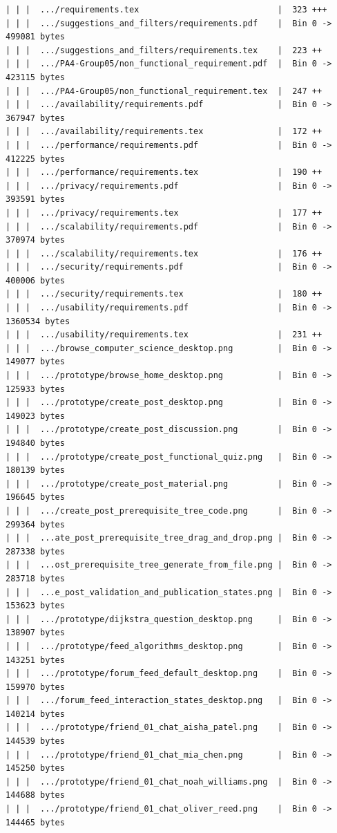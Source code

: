 \documentclass[12pt]{article}
\begin{document}
\begin{lstlisting}[numbers=none,breaklines=true]
| | |  .../requirements.tex                            |  323 +++
| | |  .../suggestions_and_filters/requirements.pdf    |  Bin 0 -> 499081 bytes
| | |  .../suggestions_and_filters/requirements.tex    |  223 ++
| | |  .../PA4-Group05/non_functional_requirement.pdf  |  Bin 0 -> 423115 bytes
| | |  .../PA4-Group05/non_functional_requirement.tex  |  247 ++
| | |  .../availability/requirements.pdf               |  Bin 0 -> 367947 bytes
| | |  .../availability/requirements.tex               |  172 ++
| | |  .../performance/requirements.pdf                |  Bin 0 -> 412225 bytes
| | |  .../performance/requirements.tex                |  190 ++
| | |  .../privacy/requirements.pdf                    |  Bin 0 -> 393591 bytes
| | |  .../privacy/requirements.tex                    |  177 ++
| | |  .../scalability/requirements.pdf                |  Bin 0 -> 370974 bytes
| | |  .../scalability/requirements.tex                |  176 ++
| | |  .../security/requirements.pdf                   |  Bin 0 -> 400006 bytes
| | |  .../security/requirements.tex                   |  180 ++
| | |  .../usability/requirements.pdf                  |  Bin 0 -> 1360534 bytes
| | |  .../usability/requirements.tex                  |  231 ++
| | |  .../browse_computer_science_desktop.png         |  Bin 0 -> 149077 bytes
| | |  .../prototype/browse_home_desktop.png           |  Bin 0 -> 125933 bytes
| | |  .../prototype/create_post_desktop.png           |  Bin 0 -> 149023 bytes
| | |  .../prototype/create_post_discussion.png        |  Bin 0 -> 194840 bytes
| | |  .../prototype/create_post_functional_quiz.png   |  Bin 0 -> 180139 bytes
| | |  .../prototype/create_post_material.png          |  Bin 0 -> 196645 bytes
| | |  .../create_post_prerequisite_tree_code.png      |  Bin 0 -> 299364 bytes
| | |  ...ate_post_prerequisite_tree_drag_and_drop.png |  Bin 0 -> 287338 bytes
| | |  ...ost_prerequisite_tree_generate_from_file.png |  Bin 0 -> 283718 bytes
| | |  ...e_post_validation_and_publication_states.png |  Bin 0 -> 153623 bytes
| | |  .../prototype/dijkstra_question_desktop.png     |  Bin 0 -> 138907 bytes
| | |  .../prototype/feed_algorithms_desktop.png       |  Bin 0 -> 143251 bytes
| | |  .../prototype/forum_feed_default_desktop.png    |  Bin 0 -> 159970 bytes
| | |  .../forum_feed_interaction_states_desktop.png   |  Bin 0 -> 140214 bytes
| | |  .../prototype/friend_01_chat_aisha_patel.png    |  Bin 0 -> 144539 bytes
| | |  .../prototype/friend_01_chat_mia_chen.png       |  Bin 0 -> 145250 bytes
| | |  .../prototype/friend_01_chat_noah_williams.png  |  Bin 0 -> 144688 bytes
| | |  .../prototype/friend_01_chat_oliver_reed.png    |  Bin 0 -> 144465 bytes

\end{lstlisting}
\end{document}
